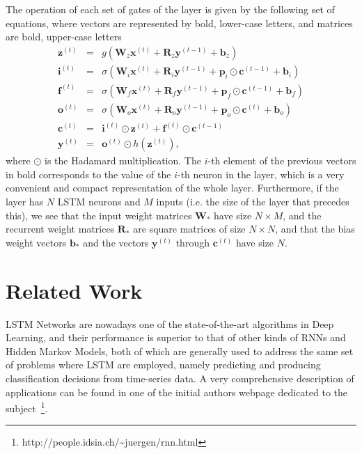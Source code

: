 \documentclass{IEEEtran}
\newcommand{\mb}[1]{\mathbf{#1}}
\begin{document}
The operation of each set of gates of the layer is given by the following set of equations, where vectors are
represented by bold, lower-case letters, and matrices are bold, upper-case letters
\begin{eqnarray}
    \mb{z}^{(t)} & = & g(\mb{W}_z \mb{x}^{(t)} + \mb{R}_z \mb{y}^{(t-1)} + \mb{b}_z) \nonumber\\
    \mb{i}^{(t)} & = & \sigma(\mb{W}_i \mb{x}^{(t)} + \mb{R}_i \mb{y}^{(t-1)} + \mb{p}_i \odot \mb{c}^{(t-1)} + \mb{b}_i) \nonumber\\
    \mb{f}^{(t)} & = & \sigma(\mb{W}_f \mb{x}^{(t)} + \mb{R}_f \mb{y}^{(t-1)} + \mb{p}_f \odot \mb{c}^{(t-1)} + \mb{b}_f) \nonumber\\
    \mb{o}^{(t)} & = & \sigma(\mb{W}_o \mb{x}^{(t)} + \mb{R}_o \mb{y}^{(t-1)} + \mb{p}_o \odot \mb{c}^{(t)} + \mb{b}_o) \nonumber\\
    \mb{c}^{(t)} & = & \mb{i}^{(t)} \odot \mb{z}^{(t)} + \mb{f}^{(t)} \odot \mb{c}^{(t-1)} \nonumber \\
    \mb{y}^{(t)} & = & \mb{o}^{(t)} \odot h(\mb{z}^{(t)}) \label{eq:equationsLSTM},
\end{eqnarray}
where $\odot$ is the Hadamard multiplication. The $i$-th element of the previous vectors in bold corresponds
to the value of the $i$-th neuron in the layer, which is a very convenient and compact representation of the
whole layer. Furthermore, if the layer has $N$ LSTM neurons and $M$ inputs (i.e. the size of the layer that
precedes this), we see that the input weight matrices $\mb{W}_*$ have size $N \times M$, and the  recurrent
weight matrices $\mb{R}_*$ are square matrices of size $N \times N$, and that the bias weight vectors $\mb{b}_*$
and the vectors $\mb{y}^{(t)}$ through $\mb{c}^{(t)}$ have size $N$.

\section{Related Work}\label{sec:relwork}
LSTM Networks are nowadays one of the state-of-the-art algorithms in Deep Learning, and their performance is
superior to that of other kinds of RNNs and Hidden Markov Models, both of which are generally used to address
the same set of problems where LSTM are employed, namely predicting and producing classification decisions
from time-series data. A very comprehensive description of applications can be found in one of the initial
authors webpage dedicated to the subject~\footnote{http://people.idsia.ch/\~{}juergen/rnn.html}.
\end{document}

